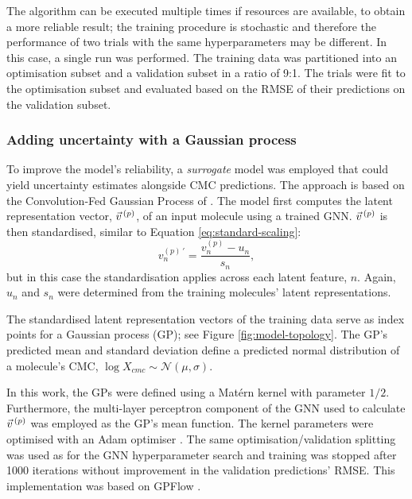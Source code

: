 The algorithm can be executed multiple times if resources are available, to
obtain a more reliable result; the training procedure is stochastic and
therefore the performance of two trials with the same hyperparameters may be
different. In this case, a single run was performed. The training data was
partitioned into an optimisation subset and a validation subset in a ratio of
9:1. The trials were fit to the optimisation subset and evaluated based on the
RMSE of their predictions on the validation subset.

\subsubsection{Adding uncertainty with a Gaussian process}

To improve the model's reliability, a \emph{surrogate} model was employed that
could yield uncertainty estimates alongside CMC predictions. The approach is
based on the Convolution-Fed Gaussian Process of
\citet{tranMethodsComparingUncertainty2020}. The model first computes the latent
representation vector, $\vec{v}^{\,(p)}{}$, of an input molecule using a trained GNN.
$\vec{v}^{\,(p)}{}$ is then standardised, similar to Equation \ref{eq:standard-scaling}:
\begin{equation}
    v^{(p)\,\prime}_n = \frac{v^{(p)}_n - u_n}{s_n},
\end{equation}
but in this case the standardisation applies across each latent feature, $n$.
Again, $u_n$ and $s_n$ were determined from the training molecules' latent
representations.

The standardised latent representation vectors of the training data serve as
index points for a Gaussian process (GP); see Figure \ref{fig:model-topology}.
The GP's predicted mean and standard deviation define a predicted normal
distribution of a molecule's CMC, $\log X_{cmc} \sim \mathcal{N}(\mu, \sigma)$.

In this work, the GPs  were defined using a Mat\'ern kernel with parameter
$1/2$. Furthermore, the multi-layer perceptron component of the GNN used to
calculate $\vec{v}^{\,(p)}{}$ was employed as the GP's mean function. The kernel parameters
were optimised with an Adam optimiser \cite{kingmaAdamMethodStochastic2017a}.
The same optimisation/validation splitting was used as for the GNN
hyperparameter search and training was stopped after \num{1000} iterations
without improvement in the validation predictions' RMSE. This implementation was
based on GPFlow \cite{matthewsGPflowGaussianProcess2017}.